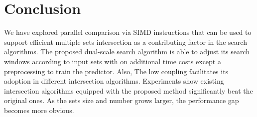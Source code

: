 \section{Conclusion}
We have explored parallel comparison via SIMD instructions that can be used to support efficient multiple sets intersection as a contributing factor in the search algorithms.
The proposed dual-scale search algorithm is able to adjust its search windows according to input sets with on additional time costs except a preprocessing to train the predictor.
Also, The low coupling facilitates its adoption in different intersection algorithms.
Experiments show existing intersection algorithms equipped with the proposed method significantly beat the original ones.
As the sets size and number grows larger, the performance gap becomes more obvious.
%
%
